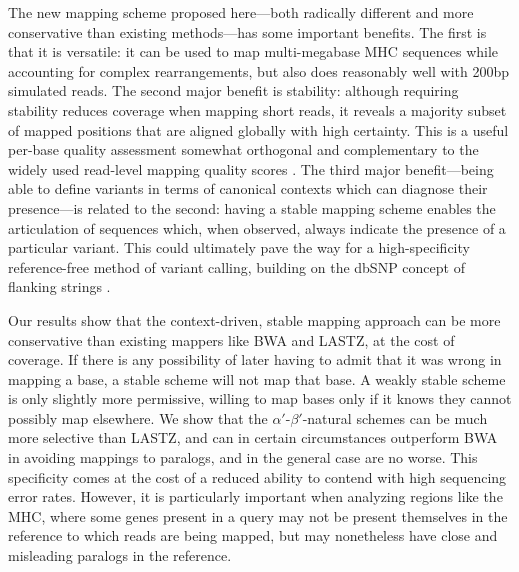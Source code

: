 The new mapping scheme proposed here---both radically different and more conservative than existing methods---has some important benefits. The first is that it is versatile: it can be used to map multi-megabase MHC sequences while accounting for complex rearrangements, but also does reasonably well with 200bp simulated reads. The second major benefit is stability: although requiring stability reduces coverage when mapping short reads, it reveals a majority subset of mapped positions that are aligned globally with high certainty. This is a useful per-base quality assessment somewhat orthogonal and complementary to the widely used read-level mapping quality scores \citep{li2008mapping}.
The third major benefit---being able to define variants in terms of canonical contexts which can diagnose their presence---is related to the second: having a stable mapping scheme enables the articulation of sequences which, when observed, always indicate the presence of a particular variant. This could ultimately pave the way for a high-specificity reference-free method of variant calling, building on the dbSNP concept of flanking strings \citep{sherry2001dbsnp}.




Our results show that the context-driven, stable mapping approach can be more conservative than existing mappers like BWA and LASTZ, at the cost of coverage. If there is any possibility of later having to admit that it was wrong in mapping a base, a stable scheme will not map that base. A weakly stable scheme is only slightly more permissive, willing to map bases only if it knows they cannot possibly map elsewhere. We show that the $\alpha'$-$\beta'$-natural schemes can be much more selective than LASTZ, and can in certain circumstances outperform BWA in avoiding mappings to paralogs, and in the general case are no worse. This specificity comes at the cost of a reduced ability to contend with high sequencing error rates. However, it is particularly important when analyzing regions like the MHC, where some genes present in a query may not be present themselves in the reference to which reads are being mapped, but may nonetheless have close and misleading paralogs in the reference. 


